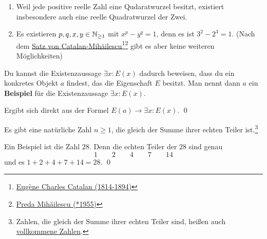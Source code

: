 
\begin{bsp}[*] \quad
    \begin{enumerate}
        \item Weil jede positive reelle Zahl eine Qudaratwurzel besitzt, existiert insbesondere auch eine reelle Quadratwurzel der Zwei.
        \item Es existieren $p,q,x,y\in \mathbb N_{\ge 1}$ mit $x^p-y^q=1$, denn es ist $3^2-2^3=1$. (Nach dem \href{https://de.wikipedia.org/wiki/Catalansche_Vermutung}{Satz von Catalan-Mihăilescu}\footnote{\href{https://de.wikipedia.org/wiki/Eug\%C3\%A8ne_Charles_Catalan}{Eugène Charles Catalan (1814-1894)}}\footnote{\href{https://de.wikipedia.org/wiki/Preda_Mih\%C4\%83ilescu}{Preda Mihăilescu (*1955)}} gibt es aber keine weiteren Möglichkeiten)
    \end{enumerate}
\end{bsp}


\begin{satz} \label{beweisperbsp} 
    Du kannst die Existenzaussage $\exists x: E(x)$ dadurch beweisen, dass du ein konkretes Objekt $a$ findest, das die Eigenschaft $E$ besitzt. Man nennt dann $a$ ein \textbf{Beispiel} für die Existenzaussage $\exists x: E(x)$.
\end{satz}


\begin{bew}
    Ergibt sich direkt aus der Formel $E(a)\to\exists x:E(x)$. \qed
\end{bew}


\begin{bsp}
    Es gibt eine natürliche Zahl $n\ge 1$, die gleich der Summe ihrer echten Teiler ist.\footnote{Zahlen, die gleich der Summe ihrer echten Teiler sind, heißen auch \href{https://de.wikipedia.org/wiki/Vollkommene_Zahl}{vollkommene Zahlen}.}
\end{bsp}


\begin{bew}
    Ein Beispiel ist die Zahl $28$. Denn die echten Teiler der $28$ sind genau
        \[ 1 \qquad 2 \qquad 4 \qquad 7 \qquad 14 \]
    und es $1+2+4+7+14=28$. \qed
\end{bew}

